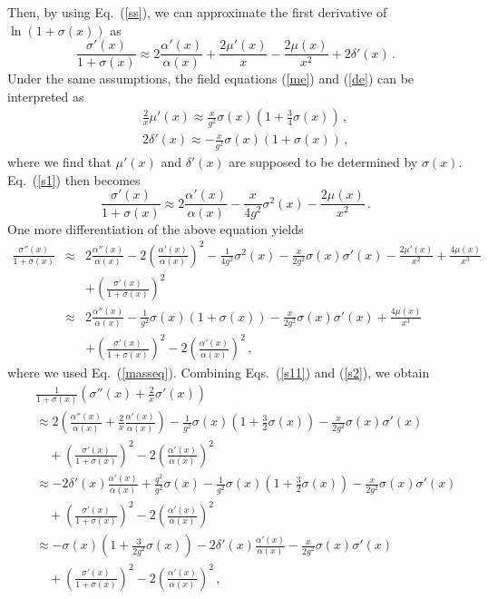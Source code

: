 \documentclass[
aps,prd,
12pt,%
nopreprintnumbers,
showpacs,
eqsecnum,
nofootinbib
]{revtex4-1}
\begin{document}
Then, by using Eq.~(\ref{ss}), we can approximate the first derivative of
$\ln(1+\sigma(x))$ as
\begin{equation}
\frac{\sigma'(x)}{1+\sigma(x)}\approx
2\frac{\alpha'(x)}{\alpha(x)}+\frac{2\mu'(x)}{x}-\frac{2\mu(x)}{x^2}+2\delta'(x)\,.
\label{s1}
\end{equation}
Under the same assumptions, the field equations (\ref{me}) and (\ref{de})
can be interpreted as
\begin{eqnarray}
& &\frac{2}{x}\mu'(x)\approx
\frac{x}{g^2}\sigma(x)\left(1+\frac{3}{4}\sigma(x)\right)\,,
\label{masseq}\\ &
&2\delta'(x)\approx-\frac{x}{g^2}
{\sigma(x)(1+\sigma(x))}\,,
\label{deltaeq}
\end{eqnarray}
where we find that $\mu'(x)$ and $\delta'(x)$ are supposed to be determined by
$\sigma(x)$. Eq.~(\ref{s1}) then becomes
\begin{equation}
\frac{\sigma'(x)}{1+\sigma(x)}\approx
2\frac{\alpha'(x)}{\alpha(x)}-\frac{x}{4g^2}\sigma^2(x)-\frac{2\mu(x)}{x^2}\,.
\label{s11}
\end{equation}
One more differentiation of the above equation yields
\begin{eqnarray}
\frac{\sigma''(x)}{1+\sigma(x)}&\approx&
2\frac{\alpha''(x)}{\alpha(x)}-2\left(\frac{\alpha'(x)}{\alpha(x)}\right)^2
-\frac{1}{4g^2}\sigma^2(x)-\frac{x}{2g^2}\sigma(x)\sigma'(x)
-\frac{2\mu'(x)}{x^2}+\frac{4\mu(x)}{x^3}\nonumber \\
& &+
\left(\frac{\sigma'(x)}{1+\sigma(x)}\right)^2\nonumber \\
&\approx&
2\frac{\alpha''(x)}{\alpha(x)}-\frac{1}{g^2}\sigma(x)(1+\sigma(x))-\frac{x}{2g^2}\sigma(x)\sigma'(x)
+\frac{4\mu(x)}{x^3}\nonumber \\
& &+
\left(\frac{\sigma'(x)}{1+\sigma(x)}\right)^2
-2\left(\frac{\alpha'(x)}{\alpha(x)}\right)^2\,,
\label{s2}
\end{eqnarray}
where we used Eq.~(\ref{masseq}).
Combining Eqs.~(\ref{s11}) and (\ref{s2}), we obtain 
\begin{eqnarray}
& &\frac{1}{1+\sigma(x)}\left(\sigma''(x)+\frac{2}{x}\sigma'(x)\right)\nonumber \\
& &\approx
2\left(\frac{\alpha''(x)}{\alpha(x)}+\frac{2}{x}\frac{\alpha'(x)}{\alpha(x)}\right)
-\frac{1}{g^2}\sigma(x)\left(1+\frac{3}{2}\sigma(x)\right)-
\frac{x}{2g^2}\sigma(x)\sigma'(x)\nonumber \\
& &\quad+
\left(\frac{\sigma'(x)}{1+\sigma(x)}\right)^2
-2\left(\frac{\alpha'(x)}{\alpha(x)}\right)^2\nonumber
\\ & &\approx
-2\delta'(x)\frac{\alpha'(x)}{\alpha(x)}+\frac{q^2}{g^2}\sigma(x)-
\frac{1}{g^2}\sigma(x)\left(1+\frac{3}{2}\sigma(x)\right)-
\frac{x}{2g^2}\sigma(x)\sigma'(x)\nonumber \\
& &\quad+
\left(\frac{\sigma'(x)}{1+\sigma(x)}\right)^2
-2\left(\frac{\alpha'(x)}{\alpha(x)}\right)^2\nonumber
\\ & &\approx
-\sigma(x)\left(1+\frac{3}{2g^2}\sigma(x)\right)
-2\delta'(x)\frac{\alpha'(x)}{\alpha(x)}-
\frac{x}{2g^2}\sigma(x)\sigma'(x)\nonumber \\
& &\quad+
\left(\frac{\sigma'(x)}{1+\sigma(x)}\right)^2
-2\left(\frac{\alpha'(x)}{\alpha(x)}\right)^2\,,
\label{eqeq}
\end{eqnarray}
\end{document}
